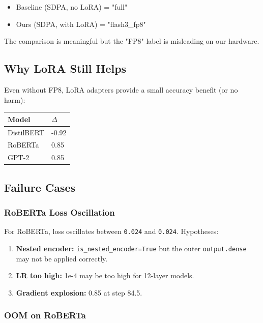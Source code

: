 \begin{itemize}
\item Baseline (SDPA, no LoRA) = "full"
\item Ours (SDPA, with LoRA) = "flash3\_fp8"

\end{itemize}
The comparison is meaningful but the "FP8" label is misleading on our 
hardware.

\subsection{Why LoRA Still Helps}

Even without FP8, LoRA adapters provide a small accuracy benefit (or no 
harm):

\begin{table}[H]
\centering
\small
\begin{tabular}{ll}
\toprule
\textbf{Model} & \textbf{$\Delta$} \\
\midrule
DistilBERT & -0.92 \\
RoBERTa & 0.85 \\
GPT-2 & 0.85 \\
\bottomrule
\end{tabular}
\end{table}

\subsection{Failure Cases}

\subsubsection{RoBERTa Loss Oscillation}

For RoBERTa, loss oscillates between \texttt{0.024} and \texttt{0.024}. 
Hypotheses:

\begin{enumerate}
\item \textbf{Nested encoder:} \texttt{is\_nested\_encoder=True} but the outer \texttt{output.dense}
  may not be applied correctly.
\item \textbf{LR too high:} 1e-4 may be too high for 12-layer models.
\item \textbf{Gradient explosion:} 0.85 at step 84.5.

\end{enumerate}
\subsubsection{OOM on RoBERTa}


